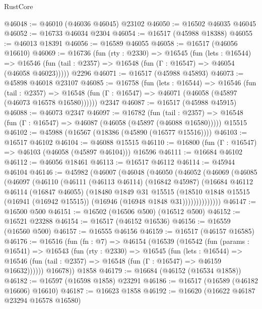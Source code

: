 \begin{lexlean}{RustCore}
\begin{coremodule}
@46048 := @46010 (@46036 @46045) @23102
@46050 := @16502 @46035 @46045
@46052 := @16733 @46034 @2304
@46054 := @16517 (@45988 @18388)
@46055 := @46013 @18391
@46056 := @16589 @46055
@46058 := @16517 (@46056 @16610)
@46069 := @16736
    (fun (rty : @2330) =>
    @16545
      (fun (lets : @16544) =>
      @16546 (fun (tail : @2357) => @16548 (fun (Γ : @16547) => @46054 (@46058 @46023)))))
    @2296
@46071 := @16517 (@45988 @45893)
@46073 := @45898 @46018 @23107
@46085 := @16758
    (fun (lets : @16544) =>
    @16546
      (fun (tail : @2357) =>
      @16548 (fun (Γ : @16547) => @46071 (@46058 (@45897 (@46073 @16578 @16580))))))
    @2347
@46087 := @16517 (@45988 @45915)
@46088 := @46073 @2347
@46097 := @16782
    (fun (tail : @2357) => @16548 (fun (Γ : @16547) => @46087 (@46058 (@45897 (@46088 @16580)))))
    @15515
@46102 := @45988 (@16567 (@18386 (@45890 (@16577 @15516))))
@46103 := @16517 @46102
@46104 := @46088 @15515
@46110 := @16800 (fun (Γ : @16547) => @46103 (@46058 (@45897 @46104))) @16596
@46111 := @16684 @46102
@46112 := @46056 @18461
@46113 := @16517 @46112
@46114 := @45944 @46104
@46146 := @45982
    (@46007
      (@46048
        (@46050
          (@46052
            (@46069
              (@46085
                (@46097
                  (@46110
                    (@46111
                      (@46113 @46114)
                      (@16842 @45987)
                      (@16684
                        @46112
                        @46114
                        (@16847 @46055)
                        (@18480
                          @1849
                          @31
                          @15515
                          (@18510
                            @1848
                            @15515
                            (@16941 (@16942 @15515))
                            (@16946 (@16948 @1848 @31))))))))))))))
@46147 := @16500 @500
@46151 := @16502 (@16506 @500) (@16512 @500)
@46152 := @16521 @23288
@46154 := @16517 (@46152 @16536)
@46156 := @16559 (@16560 @500)
@46157 := @16555 @46156
@46159 := @16517 (@46157 @16585)
@46176 := @16516
    (fun (fn : @7) =>
    @46154
      (@16539
        (@16542
          (fun (params : @16541) =>
          @16543
            (fun (rty : @2330) =>
            @16545
              (fun (lets : @16544) =>
              @16546 (fun (tail : @2357) => @16548 (fun (Γ : @16547) => @46159 @16632))))))
        @16678))
    @1858
@46179 := @16684 (@46152 (@16534 @1858))
@46182 := @16597 (@16598 @1858) @23291
@46186 := @16517 (@16589 (@46182 @16606) @16610)
@46187 := @16623 @1858
@46192 := @16620 (@16622 @46187 @23294 @16578 @16580)

\end{coremodule}
\end{lexlean}
